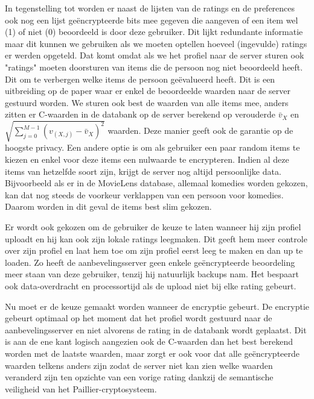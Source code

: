 In tegenstelling tot \cite{ZErkinDyn} worden er naast de lijsten van de ratings en de preferences ook nog een lijst ge\"encrypteerde bits mee gegeven die aangeven of een item wel (1) of niet (0) beoordeeld is door deze gebruiker. Dit lijkt redundante informatie maar dit kunnen we gebruiken als we moeten optellen hoeveel (ingevulde) ratings er werden opgeteld.  Dat komt omdat als we het profiel naar de server sturen ook "ratings" moeten doorsturen van items die de persoon nog niet beoordeeld heeft. Dit om te verbergen welke items de persoon ge\"evalueerd heeft. Dit is een uitbreiding op de paper \cite{ZErkinDyn} waar er enkel de beoordeelde waarden naar de server gestuurd worden. We sturen ook best de waarden van alle items mee, anders zitten er C-waarden in de databank op de server berekend op verouderde $\bar{v}_X$ en $\sqrt{\sum_{j=0}^{M-1} (v_{(X,j)} - \bar{v}_X)^2}$ waarden. Deze manier geeft ook de garantie op de hoogste privacy. Een andere optie is om als gebruiker een paar random items te kiezen en enkel voor deze items een nulwaarde te encrypteren. Indien al deze items van hetzelfde soort zijn, krijgt de server nog altijd persoonlijke data. Bijvoorbeeld als er in de MovieLens database, allemaal komedies worden gekozen, kan dat nog steeds de voorkeur verklappen van een persoon voor komedies. Daarom worden in dit geval de items best slim gekozen.

Er wordt ook gekozen om de gebruiker de keuze te laten wanneer hij zijn profiel uploadt en hij kan ook zijn lokale ratings leegmaken. Dit geeft hem meer controle over zijn profiel en laat hem toe om zijn profiel eerst leeg te maken en dan up te loaden. Zo heeft de aanbevelingsserver geen enkele ge\"encrypteerde beoordeling meer staan van deze gebruiker, tenzij hij natuurlijk backups nam. Het bespaart ook data-overdracht en processortijd als de upload niet bij elke rating gebeurt.

Nu moet er de keuze gemaakt worden wanneer de encryptie gebeurt. De encryptie gebeurt optimaal op het moment dat het profiel wordt gestuurd naar de aanbevelingsserver en niet alvorens de rating in de databank wordt geplaatst. Dit is aan de ene kant logisch aangezien ook de C-waarden dan het best berekend worden met de laatste waarden, maar zorgt er ook voor dat alle ge\"encrypteerde waarden telkens anders zijn zodat de server niet kan zien welke waarden veranderd zijn ten opzichte van een vorige rating dankzij de semantische veiligheid van het Paillier-cryptosysteem.